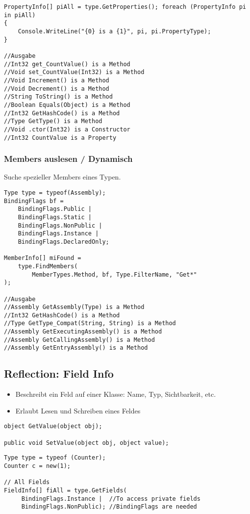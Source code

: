 \begin{multicols*}{2}
\begin{lstlisting}
PropertyInfo[] piAll = type.GetProperties(); foreach (PropertyInfo pi in piAll)
{
    Console.WriteLine("{0} is a {1}", pi, pi.PropertyType);
}

//Ausgabe
//Int32 get_CountValue() is a Method
//Void set_CountValue(Int32) is a Method
//Void Increment() is a Method
//Void Decrement() is a Method
//String ToString() is a Method
//Boolean Equals(Object) is a Method
//Int32 GetHashCode() is a Method
//Type GetType() is a Method
//Void .ctor(Int32) is a Constructor
//Int32 CountValue is a Property
\end{lstlisting}
\subsubsection{Members auslesen / Dynamisch}
Suche spezieller Members eines Typen.
\begin{lstlisting}
Type type = typeof(Assembly);
BindingFlags bf =
    BindingFlags.Public |
    BindingFlags.Static |
    BindingFlags.NonPublic |
    BindingFlags.Instance |
    BindingFlags.DeclaredOnly;

MemberInfo[] miFound =
    type.FindMembers(
        MemberTypes.Method, bf, Type.FilterName, "Get*"
);

//Ausgabe
//Assembly GetAssembly(Type) is a Method 
//Int32 GetHashCode() is a Method
//Type GetType_Compat(String, String) is a Method
//Assembly GetExecutingAssembly() is a Method
//Assembly GetCallingAssembly() is a Method
//Assembly GetEntryAssembly() is a Method
\end{lstlisting}

\subsection{Reflection: Field Info}
\begin{itemize}
    \item Beschreibt ein Feld auf einer Klasse: Name, Typ, Sichtbarkeit, etc.
    \item Erlaubt Lesen und Schreiben eines Feldes
\end{itemize}
\begin{lstlisting}
object GetValue(object obj);

public void SetValue(object obj, object value);
\end{lstlisting}
\begin{lstlisting}
Type type = typeof (Counter); 
Counter c = new(1);

// All Fields
FieldInfo[] fiAll = type.GetFields(
     BindingFlags.Instance |  //To access private fields 
     BindingFlags.NonPublic); //BindingFlags are needed


\end{lstlisting}
\end{multicols*}
